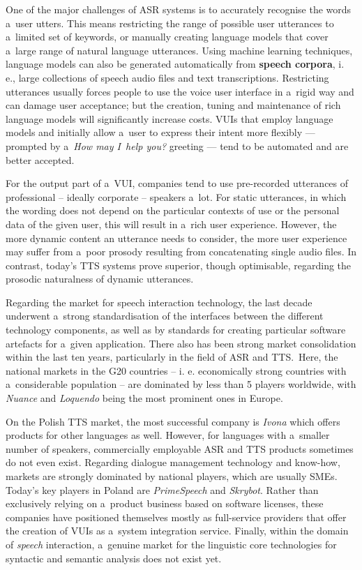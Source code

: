 \begin{multicols}{2}
One of the major challenges of ASR systems is to accurately recognise
the words a~user utters. This means restricting the range of possible
user utterances to a~limited set of keywords, or manually creating
language models that cover a~large range of natural language
utterances. Using machine learning techniques, language models can
also be generated automatically from \textbf{speech corpora}, i.\, e.,
large collections of speech audio files and text transcriptions.
Restricting utterances usually forces people to use the voice user
interface in a~rigid way and can damage user acceptance; but the
creation, tuning and maintenance of rich language models will
significantly increase costs. VUIs that employ language models and
initially allow a~user to express their intent more flexibly —
prompted by a~\textit{How may I~help you?} greeting — tend to be
automated and are better accepted. 

For the output part of a~VUI, companies tend to use pre-recorded
utterances of professional – ideally corporate – speakers a~lot.
For static utterances, in which the wording does not depend on the
particular contexts of use or the personal data of the given user,
this will result in a~rich user experience. However, the more dynamic
content an utterance needs to consider, the more user experience may
suffer from a~poor prosody resulting from concatenating single audio
files. In contrast, today’s TTS systems prove superior, though
optimisable, regarding the prosodic naturalness of dynamic utterances. 


Regarding the market for speech interaction technology, the last
decade underwent a~strong standardisation of the interfaces between
the different technology components, as well as by standards for
creating particular software artefacts for a~given application. There
also has been strong market consolidation within the last ten years,
particularly in the field of ASR and TTS.~Here, the national markets
in the G20 countries -- i. e. economically strong countries with
a~considerable population -- are dominated by less than 5 players
worldwide, with \textit{Nuance} and \textit{Loquendo} being the most
prominent ones in Europe. 

On the Polish TTS market, the most successful company is \textit{Ivona
}which offers products for other languages as well. However, for
languages with a~smaller number of speakers, commercially employable
ASR and TTS products sometimes do not even exist. Regarding dialogue
management technology and know-how, markets are strongly dominated by
national players, which are usually SMEs. Today’s key players in
Poland are \textit{PrimeSpeech} and \textit{Skrybot}. Rather than
exclusively relying on a~product business based on software licenses,
these companies have positioned themselves mostly as full-service
providers that offer the creation of VUIs as a~system integration
service. Finally, within the domain of \textit{speech} interaction,
a~genuine market for the linguistic core technologies for syntactic
and semantic analysis does not exist yet. 


\end{multicols}
